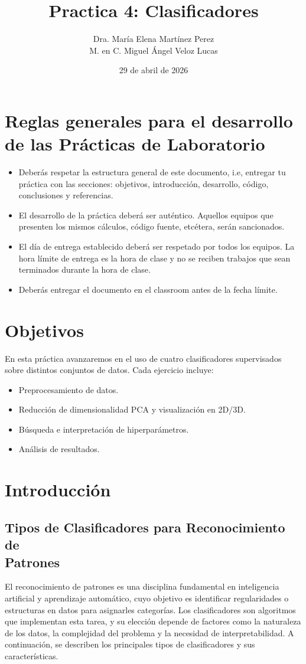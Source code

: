 \documentclass{article}
\title{Practica 4: Clasificadores}
\author{Dra. María Elena Martínez Perez \\
M. en C. Miguel Ángel Veloz Lucas}
\date{29 de abril de 2026}
\begin{document}
\maketitle
\section{Reglas generales para el desarrollo de las Prácticas de Laboratorio}

\begin{itemize}
\item Deberás respetar la estructura general de este documento, i.e, entregar tu práctica con las secciones: objetivos, introducción, desarrollo, código, conclusiones y referencias.
\item El desarrollo de la práctica deberá ser auténtico. Aquellos equipos que presenten los mismos cálculos, código fuente, etcétera, serán sancionados.
\item El día de entrega establecido deberá ser respetado por todos los equipos. La hora límite de entrega es la hora de clase y no se reciben trabajos que sean terminados durante la hora de clase.
\item  Deberás entregar el documento en el classroom antes de la fecha límite.
\end{itemize}

\section{Objetivos}

    En esta práctica avanzaremos en el uso de cuatro clasificadores supervisados sobre distintos conjuntos de datos. Cada ejercicio incluye:
\begin{itemize}

    \item Preprocesamiento de datos.
    \item Reducción de dimensionalidad PCA y visualización en 2D/3D.
    \item Búsqueda e interpretación de hiperparámetros.
    \item Análisis de resultados.
    
\end{itemize}

\section{Introducción}

\subsection{Tipos de Clasificadores para Reconocimiento de \\Patrones}
El reconocimiento de patrones es una disciplina fundamental en inteligencia artificial y aprendizaje automático, cuyo objetivo es identificar regularidades o estructuras en datos para asignarles categorías. Los clasificadores son algoritmos que implementan esta tarea, y su elección depende de factores como la naturaleza de los datos, la complejidad del problema y la necesidad de interpretabilidad. A continuación, se describen los principales tipos de clasificadores y sus características.
\end{document}
